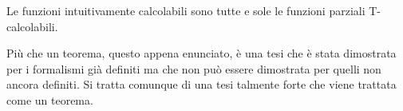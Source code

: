\begin{theorem} \label{th: church-turing}
	Le funzioni intuitivamente calcolabili sono tutte e sole
	le funzioni parziali T-calcolabili.
\end{theorem}

Più che un teorema, questo appena enunciato, è una tesi che è
stata dimostrata per i formalismi già definiti ma che non può
essere dimostrata per quelli non ancora definiti. Si tratta
comunque di una tesi talmente forte che viene trattata come un
teorema.
